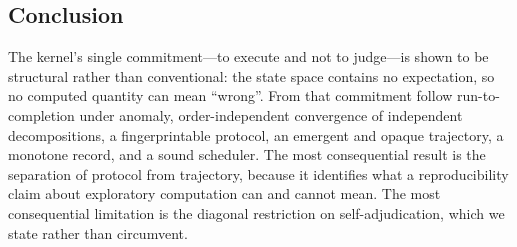 \documentclass[11pt,a4paper]{article}
\theoremstyle{thmstyle}
\theoremstyle{definition}
\theoremstyle{remark}
\begin{document}
\subsection{Conclusion}

The kernel's single commitment---to execute and not to judge---is shown to
be structural rather than conventional: the state space contains no
expectation, so no computed quantity can mean ``wrong''. From that
commitment follow run-to-completion under anomaly, order-independent
convergence of independent decompositions, a fingerprintable protocol, an
emergent and opaque trajectory, a monotone record, and a sound scheduler.
The most consequential result is the separation of protocol from trajectory,
because it identifies what a reproducibility claim about exploratory
computation can and cannot mean. The most consequential limitation is the
diagonal restriction on self-adjudication, which we state rather than
circumvent.



\end{document}
